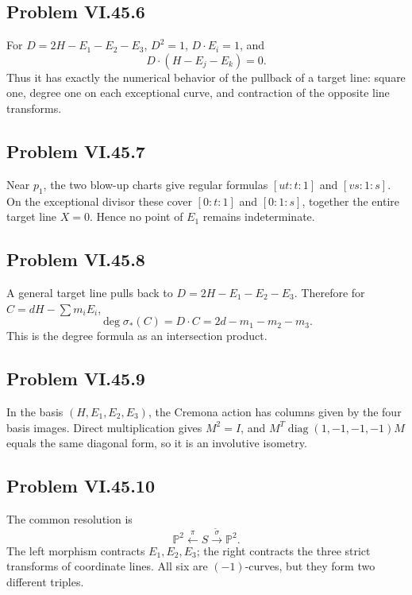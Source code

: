 \subsection*{Problem VI.45.6}
\begin{solution}
For \(D=2H-E_1-E_2-E_3\), \(D^2=1\), \(D\cdot E_i=1\), and
\[
D\cdot(H-E_j-E_k)=0.
\]
Thus it has exactly the numerical behavior of the pullback of a target line: square one, degree one on each exceptional curve, and contraction of the opposite line transforms.
\end{solution}

\subsection*{Problem VI.45.7}
\begin{solution}
Near \(p_1\), the two blow-up charts give regular formulas \([ut:t:1]\) and \([vs:1:s]\).  On the exceptional divisor these cover \([0:t:1]\) and \([0:1:s]\), together the entire target line \(X=0\).  Hence no point of \(E_1\) remains indeterminate.
\end{solution}

\subsection*{Problem VI.45.8}
\begin{solution}
A general target line pulls back to \(D=2H-E_1-E_2-E_3\).  Therefore for \(C=dH-\sum m_iE_i\),
\[
\deg\sigma_*(C)=D\cdot C=2d-m_1-m_2-m_3.
\]
This is the degree formula as an intersection product.
\end{solution}

\subsection*{Problem VI.45.9}
\begin{solution}
In the basis \((H,E_1,E_2,E_3)\), the Cremona action has columns given by the four basis images.  Direct multiplication gives \(M^2=I\), and \(M^T\operatorname{diag}(1,-1,-1,-1)M\) equals the same diagonal form, so it is an involutive isometry.
\end{solution}

\subsection*{Problem VI.45.10}
\begin{solution}
The common resolution is
\[
\mathbb P^2\xleftarrow{\pi}S\xrightarrow{\widetilde\sigma}\mathbb P^2.
\]
The left morphism contracts \(E_1,E_2,E_3\); the right contracts the three strict transforms of coordinate lines.  All six are \((-1)\)-curves, but they form two different triples.
\end{solution}

